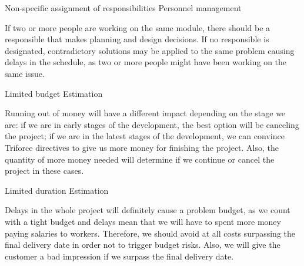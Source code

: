 \begin{risk}[riskResponsibilitesAssignment]{Non-specific assignment of responsibilities}
\riskcat Personnel management

If two or more people are working on the same module, there should be a responsible that makes planning and design decisions. If no responsible is designated, contradictory solutions may be applied to the same problem causing delays in the schedule, as two or more people might have been working on the same issue.
\end{risk}

\begin{risk}{Limited budget}
\riskcat Estimation

Running out of money will have a different impact depending on the stage we are: if we are in early stages of the development, the best option will be canceling the project; if we are in the latest stages of the development, we can convince Triforce directives to give us more money for finishing the project. Also, the quantity of more money needed will determine if we continue or cancel the project in these cases.
\end{risk}

\begin{risk}{Limited duration}
\riskcat Estimation

Delays in the whole project will definitely cause a problem budget, as we count with a tight budget and delays mean that we will have to spent more money paying salaries to workers. Therefore, we should avoid at all costs surpassing the final delivery date in order not to trigger budget risks. Also, we will give the customer a bad impression if we surpass the final delivery date.
\end{risk}
